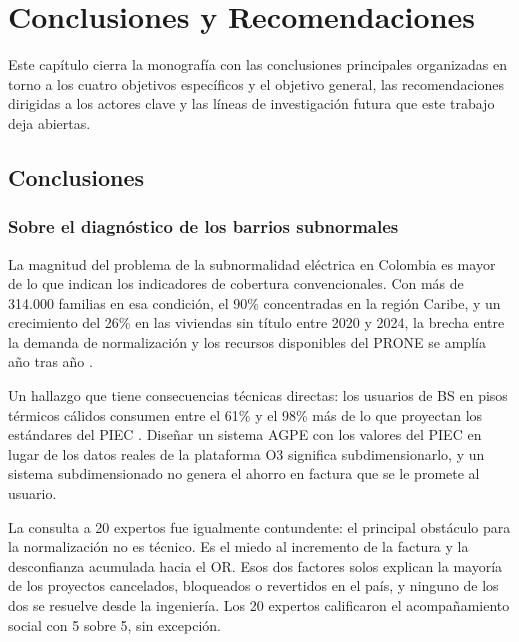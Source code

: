 
\chapter{Conclusiones y Recomendaciones}
\label{chap:conclusiones}

Este capítulo cierra la monografía con las conclusiones principales
organizadas en torno a los cuatro objetivos específicos y el objetivo
general, las recomendaciones dirigidas a los actores clave y las líneas
de investigación futura que este trabajo deja abiertas.


\section{Conclusiones}
\label{sec:conclusiones}

\subsection{Sobre el diagnóstico de los barrios subnormales}
\label{subsec:conc_diagnostico}

La magnitud del problema de la subnormalidad eléctrica en Colombia es
mayor de lo que indican los indicadores de cobertura convencionales. Con
más de 314.000 familias en esa condición, el 90\% concentradas en la
región Caribe, y un crecimiento del 26\% en las viviendas sin título
entre 2020 y 2024, la brecha entre la demanda de normalización y los
recursos disponibles del PRONE se amplía año tras año
\parencite{SSPD2020, DANE2024a}.

Un hallazgo que tiene consecuencias técnicas directas: los usuarios de
BS en pisos térmicos cálidos consumen entre el 61\% y el 98\% más de lo
que proyectan los estándares del PIEC \parencite{SSPD2025, UPME2025}.
Diseñar un sistema AGPE con los valores del PIEC en lugar de los datos
reales de la plataforma O3 significa subdimensionarlo, y un sistema
subdimensionado no genera el ahorro en factura que se le promete al
usuario.

La consulta a 20 expertos fue igualmente contundente: el principal
obstáculo para la normalización no es técnico. Es el miedo al incremento
de la factura y la desconfianza acumulada hacia el OR. Esos dos factores
solos explican la mayoría de los proyectos cancelados, bloqueados o
revertidos en el país, y ninguno de los dos se resuelve desde la
ingeniería. Los 20 expertos calificaron el acompañamiento social con
5 sobre 5, sin excepción.

